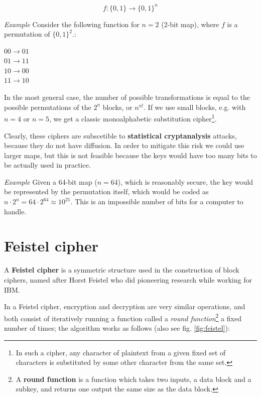 \begin{equation*}
    f: \{ 0, 1\} \rightarrow \{ 0, 1\}^n
\end{equation*}

\emph{Example} Consider the following function for $n=2$ (2-bit map), where $f$ is a permutation of $\{0, 1\}^2.$:

\begin{center} %
$00 \rightarrow 01$\\
$01 \rightarrow 11$\\
$10 \rightarrow 00$\\
$11 \rightarrow 10$\\
\end{center}

\vspace{0.5em}

In the most general case, the number of possible transformations is equal to the possible permutations of the $2^n$ blocks, or $n^{n!}$. If we use small blocks, e.g. with $n=4$ or $n=5$, we get a classic monoalphabetic substitution cipher\footnote{In such a cipher, any character of plaintext from a given fixed set of characters is substituted by some other character from the same set.}.

Clearly, these ciphers are subscetible to \textbf{statistical cryptanalysis} attacks, because they do not have diffusion. In order to mitigate this risk we could use larger maps, but this is not feasible because the keys would have too many bits to be actually used in practice.

\vspace{0.5em}

\emph{Example} Given a 64-bit map ($n=64$), which is reasonably secure, the key would be represented by the permutation itself, which would be coded as $n\cdot 2^n = 64 \cdot 2^{64} \approx 10^{21}$. This is an impossible number of bits for a computer to handle.


\section{Feistel cipher}
A \textbf{Feistel cipher} is a symmetric structure used in the construction of block ciphers, named after Horst Feistel who did pioneering research while working for IBM.

In a Feistel cipher, encryption and decryption are very similar operations, and both consist of iteratively running a function called a \textit{round function}\footnote{A \textbf{round function} is a function which takes two inputs, a data block and a subkey, and returns one output the same size as the data block.} a fixed number of times; the algorithm works as follows (also see fig. \ref{fig:feistel}):

